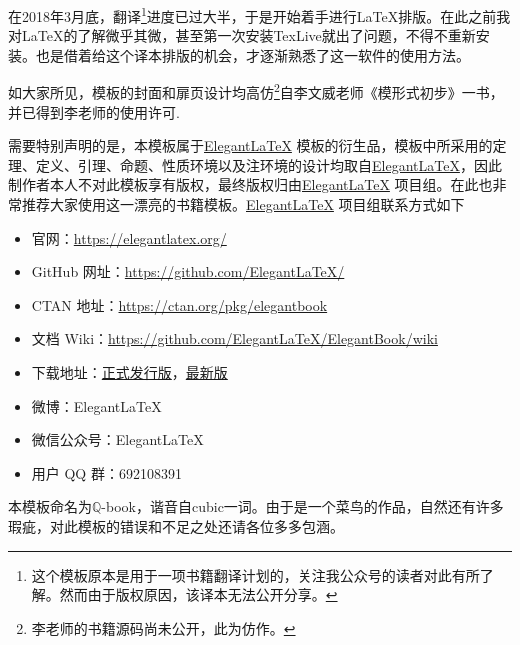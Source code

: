 \begin{overview}
\thispagestyle{empty}
在2018年3月底，翻译\footnote{这个模板原本是用于一项书籍翻译计划的，关注我公众号的读者对此有所了解。然而由于版权原因，该译本无法公开分享。}进度已过大半，于是开始着手进行\LaTeX 排版。在此之前我对\LaTeX 的了解微乎其微，甚至第一次安装TexLive就出了问题，不得不重新安装。也是借着给这个译本排版的机会，才逐渐熟悉了这一软件的使用方法。

如大家所见，模板的封面和扉页设计均高仿\footnote{李老师的书籍源码尚未公开，此为仿作。}自李文威老师《模形式初步》一书，并已得到李老师的使用许可. 

需要特别声明的是，本模板属于\href{https://elegantlatex.org/}{Elegant\LaTeX{}} 模板的衍生品，模板中所采用的定理、定义、引理、命题、性质环境以及注环境的设计均取自\href{https://elegantlatex.org/}{Elegant\LaTeX{}}，因此制作者本人不对此模板享有版权，最终版权归由\href{https://elegantlatex.org/}{Elegant\LaTeX{}} 项目组。在此也非常推荐大家使用这一漂亮的书籍模板。\href{https://elegantlatex.org/}{Elegant\LaTeX{}} 项目组联系方式如下
\begin{itemize}
  \item 官网：\href{https://elegantlatex.org/}{https://elegantlatex.org/}
  \item GitHub 网址：\href{https://github.com/ElegantLaTeX/}{https://github.com/ElegantLaTeX/}
  \item CTAN 地址：\href{https://ctan.org/pkg/elegantbook}{https://ctan.org/pkg/elegantbook}
  \item 文档 Wiki：\href{https://github.com/ElegantLaTeX/ElegantBook/wiki}{https://github.com/ElegantLaTeX/ElegantBook/wiki}
  \item 下载地址：\href{https://github.com/ElegantLaTeX/ElegantBook/releases}{正式发行版}，\href{https://github.com/ElegantLaTeX/ElegantBook/archive/master.zip}{最新版}
  \item 微博：Elegant\LaTeX{}
  \item 微信公众号：Elegant\LaTeX{}
  \item 用户 QQ 群：692108391 
\end{itemize}

本模板命名为$\mathbb{ Q }$-book，谐音自cubic一词。由于是一个菜鸟的作品，自然还有许多瑕疵，对此模板的错误和不足之处还请各位多多包涵。
\end{overview}
